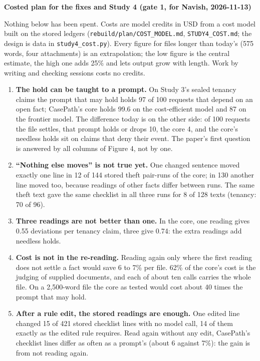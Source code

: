 \documentclass[10pt]{article}
\newcommand{\code}[1]{\texttt{#1}}
\newcommand{\doctitle}[1]{{\large\bfseries #1\par}\vspace{2pt}}
\newcommand{\sect}[1]{\needspace{5\baselineskip}\vspace{3pt}{\bfseries #1\par}\vspace{1pt}}
\begin{document}
{\fontsize{8.8}{10.6}\selectfont\setlength{\tabcolsep}{3.5pt}
\doctitle{Costed plan for the fixes and Study 4 (gate 1, for Navish, 2026-11-13)}
Nothing below has been spent. Costs are model credits in USD from a cost model built on the stored ledgers (\code{rebuild/\allowbreak{}plan/\allowbreak{}COST\_\allowbreak{}MODEL.md}, \code{STUDY4\_\allowbreak{}COST.md}; the design is data in \code{study4\_\allowbreak{}cost.py}). Every figure for files longer than today's (575 words, four attachments) is an extrapolation; the low figure is the central estimate, the high one adds 25\% and lets output grow with length. Work by writing and checking sessions costs no credits.

\sect{1. What the figure drafts found, and what it changes}
\begin{enumerate}
\item \textbf{The hold can be taught to a prompt.} On Study 3's sealed tenancy claims the prompt that may hold holds 97 of 100 requests that depend on an open fact; CasePath's core holds 99.6 on the cost-efficient model and 87 on the frontier model. The difference today is on the other side: of 100 requests the file settles, that prompt holds or drops 10, the core 4, and the core's needless holds sit on claims that deny their event. The paper's first question is answered by all columns of Figure 4, not by one.
\item \textbf{“Nothing else moves” is not true yet.} One changed sentence moved exactly one line in 12 of 144 stored theft pair-runs of the core; in 130 another line moved too, because readings of other facts differ between runs. The same theft text gave the same checklist in all three runs for 8 of 128 texts (tenancy: 70 of 96).
\item \textbf{Three readings are not better than one.} In the core, one reading gives 0.55 deviations per tenancy claim, three give 0.74: the extra readings add needless holds.
\item \textbf{Cost is not in the re-reading.} Reading again only where the first reading does not settle a fact would save 6 to 7\% per file. 62\% of the core's cost is the judging of supplied documents, and each of about ten calls carries the whole file. On a 2,500-word file the core as tested would cost about 40 times the prompt that may hold.
\item \textbf{After a rule edit, the stored readings are enough.} One edited line changed 15 of 421 stored checklist lines with no model call, 14 of them exactly as the edited rule requires. Read again without any edit, CasePath's checklist lines differ as often as a prompt's (about 6 against 7\%): the gain is from not reading again.

\end{enumerate}}
\end{document}
